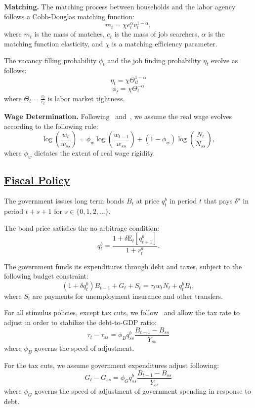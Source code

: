 \documentclass[\latexroot/\projectname]{subfiles}
\begin{document}
\textbf{Matching.} The matching process between households and the labor agency follows a Cobb-Douglas matching function:
\[
  m_{t} = \chi e_{t}^{\alpha} v_{t}^{1-\alpha},
\]
where $m_{t}$ is the mass of matches, $e_{t}$ is the mass of job searchers, $\alpha$ is the matching function elasticity, and $\chi$ is a matching efficiency parameter.

The vacancy filling probability \( \phi_t \) and the job finding probability \( \eta_t \) evolve as follows:
\[
  \eta_{t} = \chi \Theta_{it}^{1-\alpha}
\]
\[
  \phi_{t} = \chi \Theta_{t}^{-\alpha}
\]
where $\Theta_{t} = \frac{v_{t}}{e_{t}}$ is labor market tightness.

\textbf{Wage Determination.} Following~\cite{Gornemann2021} and~\cite{Blanchard2010}, we assume the real wage evolves according to the following rule:
\[
  \log\left(\frac{w_{t}}{w_{ss}}\right)  = \phi_w \log\left( \frac{ w_{t-1}}{ w_{ss}} \right) +   (1 - \phi_w) \log\left( \frac{N_{t}}{N_{ss}}\right),
\]
where $\phi_w$ dictates the extent of real wage rigidity.

\subsection{\href{https://econ-ark.github.io/HAFiscal/\#sec:hank-fiscal-policy}{Fiscal Policy}}\whenintegrated{\label{sec:hank-fiscal-policy}}

The government issues long term bonds $B_{t}$ at price $q^{b}_{t}$ in period $t$ that pays $\delta^{s}$ in period $t+s+1$ for $s \in \{0,1,2,\ldots\}$.

The bond price satisfies the no arbitrage condition:
\[
  q^{b}_{t} = \frac{ 1  + \delta \mathrm{E}_{t}[q^{b}_{t+1}]}{1+r^{a}_{t}}.
\]

The government funds its expenditures through debt and taxes, subject to the following budget constraint:
\[
  (1 + \delta q^{b}_{t})B_{t-1} + G_{t}  + S_{t} = \tau_{t} w_{t} N_{t}+ q^{b}_{t}B_{t},
\]
where $S_{t}$ are payments for unemployment insurance and other transfers.

For all stimulus policies, except tax cuts, we follow~\cite{arsJumpsHumps} and allow the tax rate to adjust in order to stabilize the debt-to-GDP ratio:
\[
  \tau_{t} - \tau_{ss} = \phi_{B} q^{b}_{ss} \frac{B_{t-1} - B_{ss} }{Y_{ss}}
\]
where $\phi_{B}$ governs the speed of adjustment.

For the tax cuts, we assume government expenditures adjust following:
\[
  G_{t} - G_{ss} = \phi_{G} q^{b}_{ss} \frac{B_{t-1} - B_{ss} }{Y_{ss}}
\]
where $\phi_{G}$ governs the speed of adjustment of government spending in response to debt.
\end{document}
